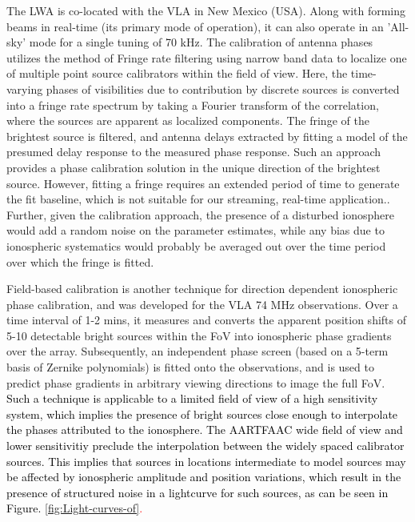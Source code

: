 \documentclass{aa}
\begin{document}
The LWA\citep{ellingsonLWA1} is co-located with the VLA in New Mexico
(USA). Along with forming beams in real-time (its primary mode of
operation), it can also operate in an 'All-sky' mode for a single
tuning of 70 kHz. The calibration of antenna phases utilizes the method
of Fringe rate filtering using narrow band data to localize one of
multiple point source calibrators within the field of view. Here,
the time-varying phases of visibilities due to contribution by discrete
sources is converted into a fringe rate spectrum by taking a Fourier
transform of the correlation, where the sources are apparent as localized
components. The fringe of the brightest source is filtered, and antenna
delays extracted by fitting a model of the presumed delay response
to the measured phase response. Such an approach provides a phase
calibration solution in the unique direction of the brightest source.
However, fitting a fringe requires an extended period of time to generate
the fit baseline, which is not suitable for our streaming, real-time
application.. Further, given the calibration approach, the presence
of a disturbed ionosphere would add a random noise on the parameter
estimates, while any bias due to ionospheric systematics would probably
be averaged out over the time period over which the fringe is fitted.

Field-based calibration\citep{cottona2004beyond} is another technique
for direction dependent ionospheric phase calibration, and was developed
for the VLA 74 MHz observations. Over a time interval of 1-2 mins,
it measures and converts the apparent position shifts of 5-10 detectable
bright sources within the FoV into ionospheric phase gradients over
the array. Subsequently, an independent phase screen (based on a 5-term
basis of Zernike polynomials) is fitted onto the observations, and
is used to predict phase gradients in arbitrary viewing directions
to image the full FoV.\textcolor{red}{{} }\textcolor{black}{Such a technique
is applicable to a limited field of view of a high sensitivity system,
which implies the presence of bright sources close enough to interpolate
the phases attributed to the ionosphere. The AARTFAAC wide field of
view and lower sensitivitiy preclude the interpolation between the
widely spaced calibrator sources. This implies that sources in locations
intermediate to model sources may be affected by ionospheric amplitude
and position variations, which result in the presence of structured
noise in a lightcurve for such sources, as can be seen in Figure.}\textcolor{red}{{}
\ref{fig:Light-curves-of}.}
\end{document}

